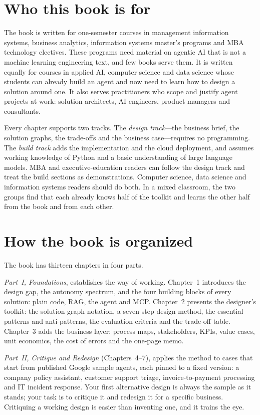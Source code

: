 \section*{Who this book is for}

The book is written for one-semester courses in management information systems, business analytics, information systems master's programs and MBA technology electives. These programs need material on agentic AI that is not a machine learning engineering text, and few books serve them. It is written equally for courses in applied AI, computer science and data science whose students can already build an agent and now need to learn how to design a solution around one. It also serves practitioners who scope and justify agent projects at work: solution architects, AI engineers, product managers and consultants.

Every chapter supports two tracks. The \emph{design track}---the business brief, the solution graphs, the trade-offs and the business case---requires no programming. The \emph{build track} adds the implementation and the cloud deployment, and assumes working knowledge of Python and a basic understanding of large language models. MBA and executive-education readers can follow the design track and treat the build sections as demonstrations. Computer science, data science and information systems readers should do both. In a mixed classroom, the two groups find that each already knows half of the toolkit and learns the other half from the book and from each other.

\section*{How the book is organized}

The book has thirteen chapters in four parts.

\emph{Part~I, Foundations}, establishes the way of working. Chapter~1 introduces the design gap, the autonomy spectrum, and the four building blocks of every solution: plain code, RAG, the agent and MCP. Chapter~2 presents the designer's toolkit: the solution-graph notation, a seven-step design method, the essential patterns and anti-patterns, the evaluation criteria and the trade-off table. Chapter~3 adds the business layer: process maps, stakeholders, KPIs, value cases, unit economics, the cost of errors and the one-page memo.

\emph{Part~II, Critique and Redesign} (Chapters~4--7), applies the method to cases that start from published Google sample agents, each pinned to a fixed version: a company policy assistant, customer support triage, invoice-to-payment processing and IT incident response. Your first alternative design is always the sample as it stands; your task is to critique it and redesign it for a specific business. Critiquing a working design is easier than inventing one, and it trains the eye.

